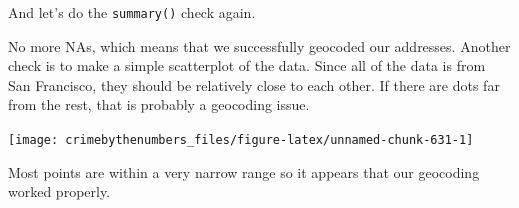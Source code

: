 \documentclass[
  a4paper,
]{krantz}
\makeatletter
\newenvironment{Shaded}{\begin{snugshade}}{\end{snugshade}}
\newcommand{\CommentTok}[1]{\textcolor[rgb]{0.56,0.35,0.01}{\textit{#1}}}
\newcommand{\FunctionTok}[1]{\textcolor[rgb]{0.00,0.00,0.00}{#1}}
\newcommand{\NormalTok}[1]{#1}
\newcommand{\SpecialCharTok}[1]{\textcolor[rgb]{0.00,0.00,0.00}{#1}}
\newenvironment{kframe}{%
\medskip{}
\setlength{\fboxsep}{.8em}
 \def\at@end@of@kframe{}%
 \ifinner\ifhmode%
  \def\at@end@of@kframe{\end{minipage}}%
  \begin{minipage}{\columnwidth}%
 \fi\fi%
 \def\FrameCommand##1{\hskip\@totalleftmargin \hskip-\fboxsep
 \colorbox{shadecolor}{##1}\hskip-\fboxsep
     \hskip-\linewidth \hskip-\@totalleftmargin \hskip\columnwidth}%
 \MakeFramed {\advance\hsize-\width
   \@totalleftmargin\z@ \linewidth\hsize
   \@setminipage}}%
 {\par\unskip\endMakeFramed%
 \at@end@of@kframe}
\renewenvironment{Shaded}{\begin{kframe}}{\end{kframe}}
\makeatother
\begin{document}
And let's do the \texttt{summary()} check again.

\begin{Shaded}
\end{Shaded}

\begin{Shaded}
\end{Shaded}

No more NAs, which means that we successfully geocoded our
addresses. Another check is to make a simple scatterplot of
the data. Since all of the data is from San Francisco, they
should be relatively close to each other. If there are dots
far from the rest, that is probably a geocoding issue.

\begin{Shaded}
\end{Shaded}

\begin{center}\texttt{[image: crimebythenumbers\_files/figure-latex/unnamed-chunk-631-1]} \end{center}

Most points are within a very narrow range so it appears
that our geocoding worked properly.

  

\backmatter
\printindex
\end{document}
